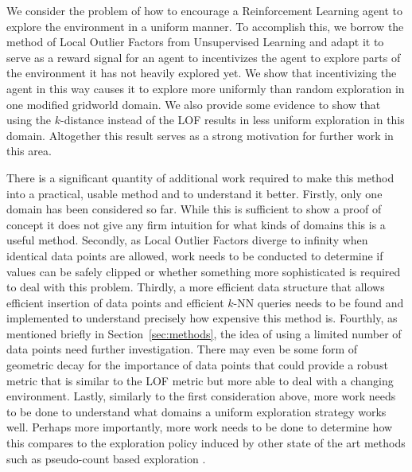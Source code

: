 \documentclass[../main.tex]{subfiles}
\begin{document}
We consider the problem of how to encourage a Reinforcement Learning agent to explore the environment in a uniform manner. To accomplish this, we borrow the method of Local Outlier Factors from Unsupervised Learning and adapt it to serve as a reward signal for an agent to incentivizes the agent to explore parts of the environment it has not heavily explored yet. We show that incentivizing the agent in this way causes it to explore more uniformly than random exploration in one modified gridworld domain. We also provide some evidence to show that using the $k$-distance instead of the LOF results in less uniform exploration in this domain. Altogether this result serves as a strong motivation for further work in this area.

There is a significant quantity of additional work required to make this method into a practical, usable method and to understand it better. Firstly, only one domain has been considered so far. While this is sufficient to show a proof of concept it does not give any firm intuition for what kinds of domains this is a useful method. Secondly, as Local Outlier Factors diverge to infinity when identical data points are allowed, work needs to be conducted to determine if values can be safely clipped or whether something more sophisticated is required to deal with this problem. Thirdly, a more efficient data structure that allows efficient insertion of data points and efficient $k$-NN queries needs to be found and implemented to understand precisely how expensive this method is. Fourthly, as mentioned briefly in Section~\ref{sec:methods}, the idea of using a limited number of data points need further investigation. There may even be some form of geometric decay for the importance of data points that could provide a robust metric that is similar to the LOF metric but more able to deal with a changing environment. Lastly, similarly to the first consideration above, more work needs to be done to understand what domains a uniform exploration strategy works well. Perhaps more importantly, more work needs to be done to determine how this compares to the exploration policy induced by other state of the art methods such as pseudo-count based exploration \cite{DBLP:conf/nips/BellemareSOSSM16}.
\end{document}
